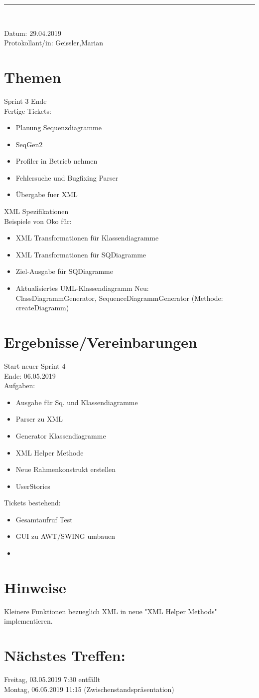 \begin{center}  
\vspace{0.5pt}\nointerlineskip\rule{\textwidth}{0.2pt}\\ 
\vspace{0.5pt}\nointerlineskip
\end{center} 
\large Datum: 29.04.2019\vspace{3pt}\\\large Protokollant/in: Geissler,Marian
\section*{Themen}
Sprint 3 Ende \\
Fertige Tickets: 
\begin{itemize}
\item Planung Sequenzdiagramme
\item SeqGen2 
\item Profiler in Betrieb nehmen
\item Fehlersuche und Bugfixing Parser
\item Übergabe fuer XML
\end{itemize}
XML Spezifikationen \\
Beispiele von Oko für: 
\begin{itemize}
\item XML Transformationen für Klassendiagramme
\item XML Transformationen für SQDiagramme
\item Ziel-Ausgabe für SQDiagramme
\item Aktualisiertes UML-Klassendiagramm
Neu: \\
ClassDiagrammGenerator, SequenceDiagrammGenerator (Methode: createDiagramm)
\end{itemize} 
\section*{Ergebnisse/Vereinbarungen}
Start neuer Sprint 4 \\
Ende: 06.05.2019\\
Aufgaben:
\begin{itemize}
\item Ausgabe für Sq. und Klassendiagramme
\item Parser zu XML
\item Generator Klassendiagramme
\item XML Helper Methode
\item Neue Rahmenkonstrukt erstellen
\item UserStories
\end{itemize} 
Tickets bestehend:
\begin{itemize}
\item Gesamtaufruf Test
\item GUI zu AWT/SWING umbauen
\item 
\end{itemize} 
\section*{Hinweise}
Kleinere Funktionen bezueglich XML in neue "XML Helper Methods" implementieren. 
\section*{Nächstes Treffen:}
Freitag, 03.05.2019 7:30 entfällt\\
Montag, 06.05.2019 11:15 (Zwischenstandspräsentation)